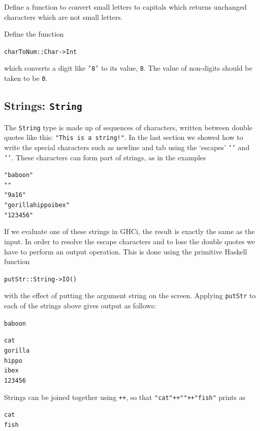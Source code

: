 \begin{exercises}

\item Define a function to convert small letters to capitals which returns
unchanged characters which are not small letters.

\item Define the function
\begin{alltt}
charToNum :: Char -> Int
\end{alltt}
which converts a digit like \texttt{'8'} to its value, \texttt{8}. The value of
non-digits should be taken to be \texttt{0}.


\end{exercises}


\subsection*{Strings: \texttt{String}}

The \texttt{String} type is made up of sequences of characters, written between double quotes like this: \texttt{"This is a string!"}. In the last section 
 we showed how to write
the special characters such as newline and tab using the `escapes'
\texttt{''} and \texttt{''}. These characters can form part
of strings, as in the examples
\begin{alltt}
"baboon"
""
"9a16"
"gorillahippoibex"
"123456"
\end{alltt}
If we evaluate one of these strings in GHCi, the result is exactly the same as the
input. In order to resolve the escape characters  and to lose the double quotes we have to
perform an output operation. This is done using the primitive Haskell function
\begin{alltt}
putStr :: String -> IO ()
\end{alltt} 
with the effect of putting the argument string on the screen. Applying \texttt{putStr} 
to each of the strings above gives output as follows:
\begin{alltt}
baboon

cat
gorilla
hippo
ibex
1       23      456
\end{alltt}
Strings can be joined together using \texttt{++}\minx{++}, so that 
\texttt{"cat"++""++"fish"} prints as
\begin{alltt}
cat
fish
\end{alltt}

